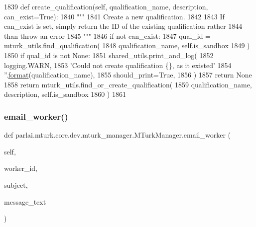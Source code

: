 \begin{DoxyCode}
1839     \textcolor{keyword}{def }create\_qualification(self, qualification\_name, description, can\_exist=True):
1840         \textcolor{stringliteral}{"""}
1841 \textcolor{stringliteral}{        Create a new qualification.}
1842 \textcolor{stringliteral}{}
1843 \textcolor{stringliteral}{        If can\_exist is set, simply return the ID of the existing qualification rather}
1844 \textcolor{stringliteral}{        than throw an error}
1845 \textcolor{stringliteral}{        """}
1846         \textcolor{keywordflow}{if} \textcolor{keywordflow}{not} can\_exist:
1847             qual\_id = mturk\_utils.find\_qualification(
1848                 qualification\_name, self.is\_sandbox
1849             )
1850             \textcolor{keywordflow}{if} qual\_id \textcolor{keywordflow}{is} \textcolor{keywordflow}{not} \textcolor{keywordtype}{None}:
1851                 shared\_utils.print\_and\_log(
1852                     logging.WARN,
1853                     \textcolor{stringliteral}{'Could not create qualification \{\}, as it existed'}
1854                     \textcolor{stringliteral}{''}.\hyperlink{namespaceparlai_1_1chat__service_1_1services_1_1messenger_1_1shared__utils_a32e2e2022b824fbaf80c747160b52a76}{format}(qualification\_name),
1855                     should\_print=\textcolor{keyword}{True},
1856                 )
1857                 \textcolor{keywordflow}{return} \textcolor{keywordtype}{None}
1858         \textcolor{keywordflow}{return} mturk\_utils.find\_or\_create\_qualification(
1859             qualification\_name, description, self.is\_sandbox
1860         )
1861 
\end{DoxyCode}
\mbox{\label{classparlai_1_1mturk_1_1core_1_1dev_1_1mturk__manager_1_1MTurkManager_ac64c09da4a9c4e2f2cc74889f2f829d5}} 
\subsubsection{\texorpdfstring{email\+\_\+worker()}{email\_worker()}}
{\footnotesize\ttfamily def parlai.\+mturk.\+core.\+dev.\+mturk\+\_\+manager.\+M\+Turk\+Manager.\+email\+\_\+worker (\begin{DoxyParamCaption}\item[{}]{self,  }\item[{}]{worker\+\_\+id,  }\item[{}]{subject,  }\item[{}]{message\+\_\+text }\end{DoxyParamCaption})}

